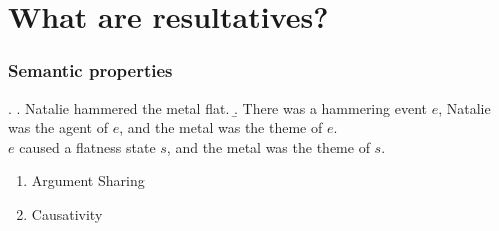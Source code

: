 \documentclass{beamer}
\begin{document}
\section{What are resultatives?}
\begin{frame}
  \frametitle{Semantic properties}
  \ex.
  \a. {\rm Natalie hammered the metal flat.}
  \b. There was a hammering event $e$, Natalie was the agent of $e$, and \alert<2>{the metal} was the theme of $e$.\\
  $e$ \alert<3>{caused} a flatness state $s$, and \alert<2>{the metal} was the theme of $s$.

  \pause
  \begin{enumerate}
    \item \alert<2>{Argument Sharing}
    \item \alert<3>{Causativity}
  \end{enumerate}
\end{frame}
\end{document}
